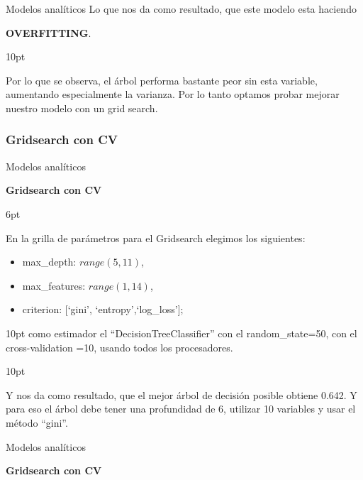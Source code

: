 \documentclass[pdf]{beamer}
\def\vspace{}%
\begin{document}
{\begin{frame}{Modelos analíticos}
    Lo que nos da como resultado, que este modelo esta haciendo 
    
    \textbf{OVERFITTING}.

\vspace{10pt}

    Por lo que se observa, el árbol performa bastante peor sin esta variable, aumentando especialmente la varianza. Por lo tanto optamos probar mejorar nuestro modelo con un grid search.

\end{frame}

\subsubsection{Gridsearch con CV}

\begin{frame}{Modelos analíticos}
    \begin{Large}
        \textbf{Gridsearch con CV}
    \end{Large}
    \vspace{6pt}
    
    En la grilla de parámetros para el Gridsearch elegimos los siguientes:
    \begin{itemize}
        \item max\_depth: $range(5,11)$,
        \item max\_features: $range(1,14)$,
        \item criterion: [`gini', `entropy',`log\_loss'];
    \end{itemize}

\vspace{10pt}
    como estimador el ``DecisionTreeClassifier'' con el random\_state=50, con el cross-validation =10,  usando todos los procesadores.

\vspace{10pt}

    Y nos da como resultado, que el mejor árbol de decisión posible obtiene 0.642. Y para eso el árbol debe tener una profundidad de  6, utilizar  10  variables y usar el método ``gini''.

\end{frame}

\begin{frame}{Modelos analíticos}
    
    \begin{Large}
        \textbf{Gridsearch con CV}
    \end{Large}


\end{frame}}
\end{document}
